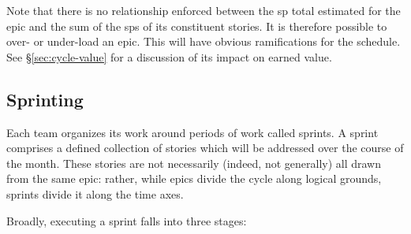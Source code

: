 Note that there is no relationship enforced between the \gls{sp} total estimated for the \gls{epic} and the sum of the \glspl{sp} of its constituent stories.
It is therefore possible to over- or under-load an \gls{epic}.
This will have obvious ramifications for the schedule.
See \S\ref{sec:cycle-value} for a discussion of its impact on earned value.

\subsection{Sprinting}
\label{sec:sprinting}

Each team organizes its work around periods of work called sprints.
A sprint comprises a defined collection of stories which will be addressed over the course of the month.
These stories are not necessarily (indeed, not generally) all drawn from the same \gls{epic}: rather, while \glspl{epic} divide the \gls{cycle} along logical grounds, sprints divide it along the time axes.

Broadly, executing a sprint falls into three stages:

